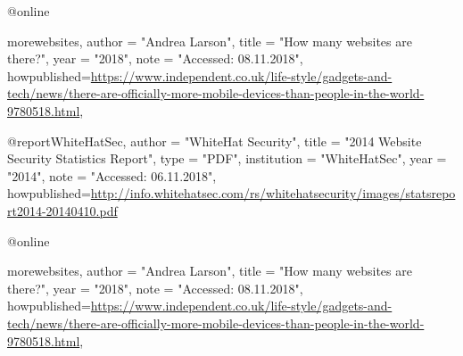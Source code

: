 @online{morewebsites,
    author = "Andrea Larson",
    title = "How many websites are there?",
    year = "2018",
    note = "Accessed: 08.11.2018",
    howpublished={\url{https://www.independent.co.uk/life-style/gadgets-and-tech/news/there-are-officially-more-mobile-devices-than-people-in-the-world-9780518.html}},

}

@report{WhiteHatSec,
author = "WhiteHat Security",
title = "2014 Website Security Statistics Report",
type = "PDF",
institution = "WhiteHatSec",
year = "2014",
note = "Accessed: 06.11.2018",
howpublished={\url{http://info.whitehatsec.com/rs/whitehatsecurity/images/statsreport2014-20140410.pdf}}
}

@online{morewebsites,
    author = "Andrea Larson",
    title = "How many websites are there?",
    year = "2018",
    note = "Accessed: 08.11.2018",
    howpublished={\url{https://www.independent.co.uk/life-style/gadgets-and-tech/news/there-are-officially-more-mobile-devices-than-people-in-the-world-9780518.html}},

}


 